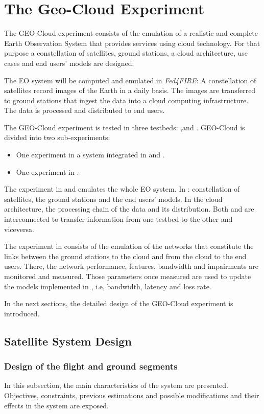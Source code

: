 
\chapter{The Geo-Cloud Experiment}

The GEO-Cloud experiment consists of the emulation of a realistic and complete Earth Observation System that provides services using cloud technology. For that purpose a constellation of satellites, ground stations, a cloud architecture, use cases and end users' models are designed.

The \acs{EO} system will be computed and emulated in \emph{Fed4FIRE}: A constellation of satellites record images of the Earth in a daily basis. The images are transferred to ground stations that ingest the data into a cloud computing infrastructure. The data is processed and distributed to end users.

The GEO-Cloud experiment is tested in three testbeds: \vw,\bonfire and
\pl. GEO-Cloud is divided into two sub-experiments:
\begin{itemize}
\item One experiment in a system integrated in \vw and \bonfire.
\item One experiment in \pl.
\end{itemize}

The experiment in \vw and \bonfire emulates the whole \acs{EO} system. In \vw:
constellation of satellites, the ground stations and the end users' models. In
\bonfire the cloud architecture, the processing chain of the data and its
distribution. Both \vw and \bonfire are interconnected to transfer information from one testbed to the other and viceversa.

The experiment in \pl consists of the emulation of the networks that constitute
the links between the ground stations to the cloud and from the cloud to the end
users. There, the network performance, features, bandwidth and impairments are
monitored and measured. Those parameters once measured are used to update the
models implemented in \vw, i.e, bandwidth, latency and loss rate.

In the next sections, the detailed design of the GEO-Cloud experiment is introduced.

\section{Satellite System Design}
\label{subsec:system-design}
\subsection{Design of the flight and ground segments}
\label{subsubsec:design-flight-ground}
In this subsection, the main characteristics of the system are presented. Objectives, constraints, previous estimations and possible modifications and their effects in the system are exposed.

